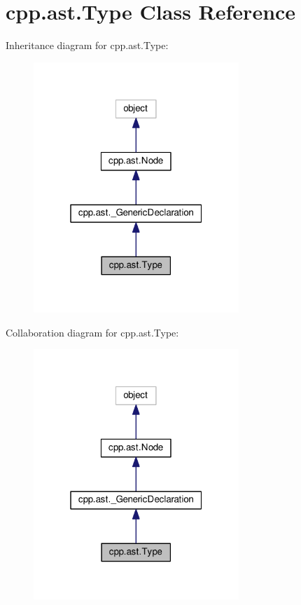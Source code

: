 \hypertarget{classcpp_1_1ast_1_1_type}{}\section{cpp.\+ast.\+Type Class Reference}
\label{classcpp_1_1ast_1_1_type}


Inheritance diagram for cpp.\+ast.\+Type\+:
\nopagebreak
\begin{figure}[H]
\begin{center}
\leavevmode
\includegraphics[width=220pt]{classcpp_1_1ast_1_1_type__inherit__graph}
\end{center}
\end{figure}


Collaboration diagram for cpp.\+ast.\+Type\+:
\nopagebreak
\begin{figure}[H]
\begin{center}
\leavevmode
\includegraphics[width=220pt]{classcpp_1_1ast_1_1_type__coll__graph}
\end{center}
\end{figure}
